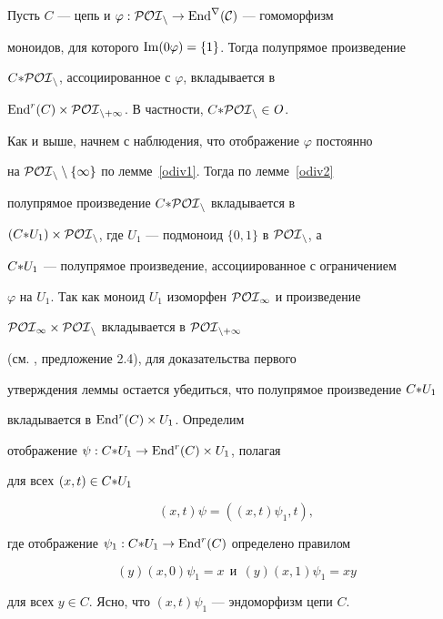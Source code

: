 \begin{lems} \label{odiv4}


Пусть $C$ --- цепь и $\varphi:\cal{POI}_n\rightarrow\operatorname{End}^r(C)$ --- гомоморфизм


моноидов, для которого $\operatorname{Im}(0\varphi)=\{1\}$. Тогда полупрямое произведение


$C{*} \cal{POI}_n$, ассоциированное с $\varphi$, вкладывается в


$\operatorname{End}^r(C)\times\cal{POI}_{n+1}$. В частности, $C{*} \cal{POI}_n\in$\,$\boldmath{O}$.


\end{lems}





\begin{pf}


Как и выше, начнем с наблюдения, что отображение $\varphi$ постоянно


на $\cal{POI}_n\setminus\{1\}$ по лемме~\ref{odiv1}. Тогда по лемме~\ref{odiv2}


полупрямое произведение $C{*} \cal{POI}_n$ вкладывается в


$(C{*} U_1)\times\cal{POI}_n$, где $U_1$ --- подмоноид $\{0,1\}$ в $\cal{POI}_n$, а


$C{*} U_1$ --- полупрямое произведение, ассоциированное с ограничением


$\varphi$ на $U_1$. Так как моноид $U_1$ изоморфен $\cal{POI}_1$ и произведение


$\cal{POI}_1\times\cal{POI}_n$ вкладывается в $\cal{POI}_{n+1}$


(см. \cite{VHF1}, предложение 2.4), для доказательства первого


утверждения леммы остается убедиться, что полупрямое произведение $C{*} U_1$


вкладывается в $\operatorname{End}^r(C)\times U_1$. Определим


отображение $\psi:C{*} U_1\to\operatorname{End}^r(C)\times U_1$, полагая


для всех $(x,t)\in C{*} U_1$


$$


(x,t)\psi=((x,t)\psi_1,t),


$$


где отображение $\psi_1:C{*} U_1\to\operatorname{End}^r(C)$ определено правилом


$$


(y)(x,0)\psi_1=x\ \ \text{и} \ \ (y)(x,1)\psi_1=xy


$$


для всех $y\in C$. Ясно, что $(x,t)\psi_1$ --- эндоморфизм цепи $C$.



\end{pf}
